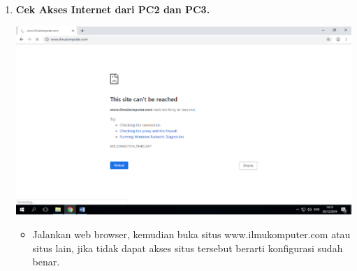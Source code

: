 \documentclass[a4paper,12pt]{article}
\begin{document}
\begin{enumerate}[label=\textbf{\arabic*.}]
    \item \textbf{Cek Akses Internet dari PC2 dan PC3.}
        \begin{center}
            \includegraphics[width=0.8\linewidth]{image16.png}
        \end{center}
        \begin{itemize}
            \item Jalankan web browser, kemudian buka situs www.ilmukomputer.com atau situs lain, jika tidak dapat akses situs tersebut berarti konfigurasi sudah benar.
        \end{itemize}


\end{enumerate}
\end{document}
